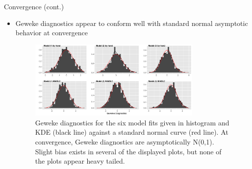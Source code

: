 \documentclass{beamer}
\begin{document}
\begin{frame}{Convergence (cont.)}
\begin{itemize}
    \item Geweke diagnostics appear to conform well with standard normal asymptotic behavior at convergence
    \begin{figure}[h]
	\centering \includegraphics[width=0.8\textwidth]{SemesterProject/geweke_diags.png}
	\caption{\tiny{Geweke diagnostics for the six model fits given in histogram and KDE (black line) against a standard normal curve (red line). At convergence, Geweke diagnostics are asymptotically N(0,1). Slight bias exists in several of the displayed plots, but none of the plots appear heavy tailed.}}
	\label{fig:geweke}
\end{figure}
\end{itemize}


\end{frame}
\end{document}
